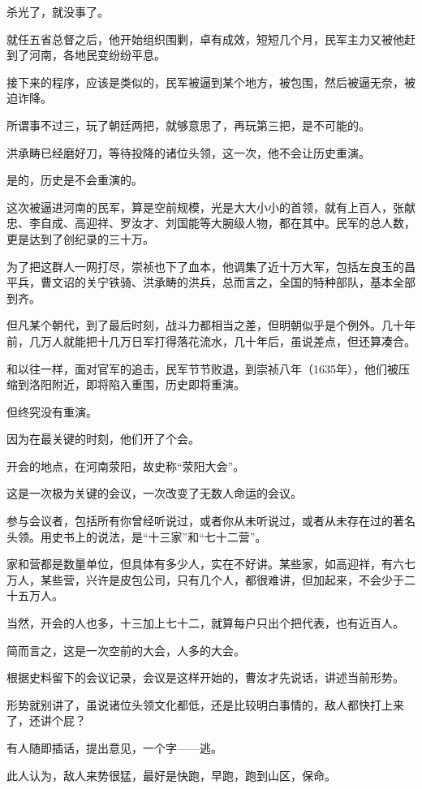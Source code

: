 \begin{multicols}{\theparacolNo}
杀光了，就没事了。

就任五省总督之后，他开始组织围剿，卓有成效，短短几个月，民军主力又被他赶到了河南，各地民变纷纷平息。

接下来的程序，应该是类似的，民军被逼到某个地方，被包围，然后被逼无奈，被迫诈降。

所谓事不过三，玩了朝廷两把，就够意思了，再玩第三把，是不可能的。

洪承畴已经磨好刀，等待投降的诸位头领，这一次，他不会让历史重演。

是的，历史是不会重演的。

这次被逼进河南的民军，算是空前规模，光是大大小小的首领，就有上百人，张献忠、李自成、高迎祥、罗汝才、刘国能等大腕级人物，都在其中。民军的总人数，更是达到了创纪录的三十万。

为了把这群人一网打尽，崇祯也下了血本，他调集了近十万大军，包括左良玉的昌平兵，曹文诏的关宁铁骑、洪承畴的洪兵，总而言之，全国的特种部队，基本全部到齐。

但凡某个朝代，到了最后时刻，战斗力都相当之差，但明朝似乎是个例外。几十年前，几万人就能把十几万日军打得落花流水，几十年后，虽说差点，但还算凑合。

和以往一样，面对官军的追击，民军节节败退，到崇祯八年（1635年），他们被压缩到洛阳附近，即将陷入重围，历史即将重演。

但终究没有重演。

因为在最关键的时刻，他们开了个会。

开会的地点，在河南荥阳，故史称“荥阳大会”。

这是一次极为关键的会议，一次改变了无数人命运的会议。

参与会议者，包括所有你曾经听说过，或者你从未听说过，或者从未存在过的著名头领。用史书上的说法，是“十三家”和“七十二营”。

家和营都是数量单位，但具体有多少人，实在不好讲。某些家，如高迎祥，有六七万人，某些营，兴许是皮包公司，只有几个人，都很难讲，但加起来，不会少于二十五万人。

当然，开会的人也多，十三加上七十二，就算每户只出个把代表，也有近百人。

简而言之，这是一次空前的大会，人多的大会。

根据史料留下的会议记录，会议是这样开始的，曹汝才先说话，讲述当前形势。

形势就别讲了，虽说诸位头领文化都低，还是比较明白事情的，敌人都快打上来了，还讲个屁？

有人随即插话，提出意见，一个字——逃。

此人认为，敌人来势很猛，最好是快跑，早跑，跑到山区，保命。


\end{multicols}
